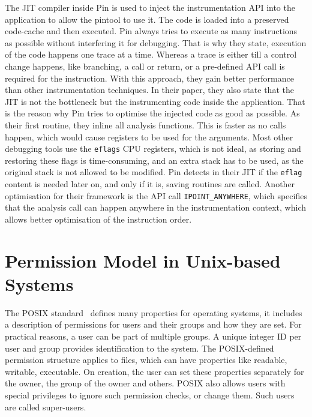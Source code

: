 The JIT compiler inside Pin is used to inject the instrumentation API into the
application to allow the pintool to use it. The code is loaded into a preserved
code-cache and then executed. Pin always tries to execute as many instructions
as possible without interfering it for debugging. That is why they state,
execution of the code happens one trace at a time. Whereas a trace is either
till a control change happens, like branching, a call or return, or a
pre-defined API call is required for the instruction. With this approach, they
gain better performance than other instrumentation techniques. In their paper,
they also state that the JIT is not the bottleneck but the instrumenting code
inside the application. That is the reason why Pin tries to optimise the
injected code as good as possible. As their first routine, they inline all
analysis functions. This is faster as no calls happen, which would cause
registers to be used for the arguments. Most other debugging tools use the
\texttt{eflags} CPU registers, which is not ideal, as storing and restoring
these flags is time-consuming, and an extra stack has to be used, as the
original stack is not allowed to be modified. Pin detects in their JIT if the
\texttt{eflag} content is needed later on, and only if it is, saving routines
are called. Another optimisation for their framework is the API call
\texttt{IPOINT\_ANYWHERE}, which specifies that the analysis call can happen
anywhere in the instrumentation context, which allows better optimisation of the
instruction order.

\section{Permission Model in Unix-based Systems}

The POSIX standard~\cite{posix} defines many properties for operating systems,
it includes a description of permissions for users and their groups and how
they are set. For practical reasons, a user can be part of multiple groups. A
unique integer ID per user and group provides identification to the system. The
POSIX-defined permission structure applies to files, which can have properties
like readable, writable, executable. On creation, the user can set these
properties separately for the owner, the group of the owner and others. POSIX
also allows users with special privileges to ignore such permission checks, or
change them. Such users are called super-users.


